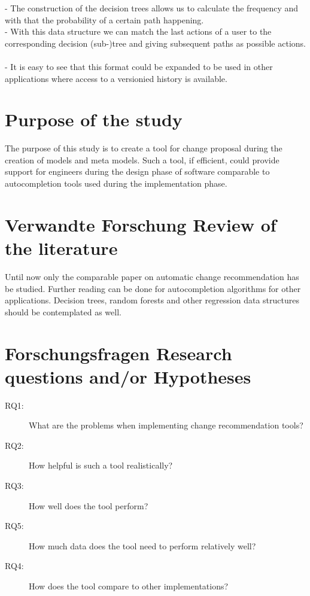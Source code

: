 \documentclass[10pt,a4paper,oneside]{scrartcl}
\begin{document}
- The construction of the decision trees allows us to calculate the frequency and with that the probability of a certain path happening.
\\
- With this data structure we can match the last actions of a user to the corresponding decision (sub-)tree and giving subsequent paths as possible actions.
\\
\\
- It is easy to see that this format could be expanded to be used in other applications where access to a versionied history is available.


\section{Purpose of the study}
The purpose of this study is to create a tool for change proposal during the creation of models and meta models. Such a tool, if efficient, could provide support for engineers during the design phase of software comparable to autocompletion tools used during the implementation phase. 

\section{
	{Verwandte Forschung}
	{Review of the literature}}

{}
Until now only the comparable paper on automatic change recommendation has be studied. Further reading can be done for autocompletion algorithms for other applications. Decision trees, random forests and other regression data structures should be contemplated as well.


\section{
	{Forschungsfragen}
	{Research questions and/or Hypotheses}}
\label{sub:questions}

{}
%
\begin{description}
\item[RQ1:] What are the problems when implementing change recommendation tools?
\item[RQ2:] How helpful is such a tool realistically?
\item[RQ3:] How well does the tool perform?
\item[RQ5:] How much data does the tool need to perform relatively well?
\item[RQ4:] How does the tool compare to other implementations?
\end{description}
\end{document}

